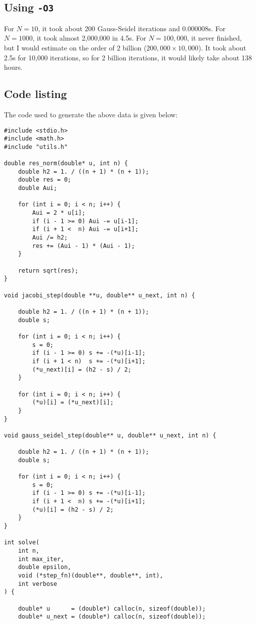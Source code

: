 \documentclass[11pt]{article}
\begin{document}
\subsection*{Using \texttt{-O3}}
For $N = 10$, it took about 200 Gauss-Seidel iterations and 0.000008s. For $N = 1000$, it took
almost 2,000,000 in 4.5s. For $N = 100,000$, it never finished, but I would estimate on
the order of 2 billion ($200,000 \times 10,000$). It took about 2.5s for 10,000 iterations, so for 2 billion iterations, it would likely take about 138 hours.

\subsection*{Code listing} 
The code used to generate the above data is given below:
\begin{verbatim}
#include <stdio.h>
#include <math.h>
#include "utils.h"

double res_norm(double* u, int n) {
    double h2 = 1. / ((n + 1) * (n + 1));
    double res = 0;
    double Aui;

    for (int i = 0; i < n; i++) {
        Aui = 2 * u[i];
        if (i - 1 >= 0) Aui -= u[i-1];
        if (i + 1 <  n) Aui -= u[i+1];
        Aui /= h2;
        res += (Aui - 1) * (Aui - 1);
    }

    return sqrt(res);
}

void jacobi_step(double **u, double** u_next, int n) {

    double h2 = 1. / ((n + 1) * (n + 1));
    double s;

    for (int i = 0; i < n; i++) {
        s = 0;
        if (i - 1 >= 0) s += -(*u)[i-1];
        if (i + 1 < n)  s += -(*u)[i+1];
        (*u_next)[i] = (h2 - s) / 2;
    }

    for (int i = 0; i < n; i++) {
        (*u)[i] = (*u_next)[i];
    }
}

void gauss_seidel_step(double** u, double** u_next, int n) {
    
    double h2 = 1. / ((n + 1) * (n + 1));
    double s;

    for (int i = 0; i < n; i++) {
        s = 0;
        if (i - 1 >= 0) s += -(*u)[i-1];
        if (i + 1 <  n) s += -(*u)[i+1];
        (*u)[i] = (h2 - s) / 2;
    }
}

int solve(
    int n, 
    int max_iter,
    double epsilon, 
    void (*step_fn)(double**, double**, int), 
    int verbose
) {

    double* u      = (double*) calloc(n, sizeof(double));
    double* u_next = (double*) calloc(n, sizeof(double));


\end{verbatim}
\end{document}
